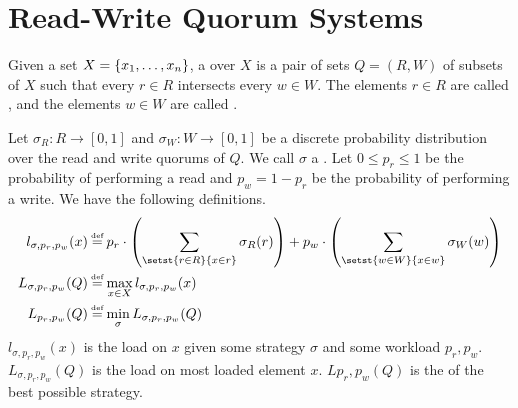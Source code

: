 \section{Read-Write Quorum Systems}

Given a set $X = \{x_1, \ldots, x_n\}$, a 
over $X$ is a pair of sets $Q = (R, W)$ of subsets of $X$ such that every $r
\in R$ intersects every $w \in W$. The elements $r \in R$ are called
, and the elements $w \in W$ are called .



Let $\sigma_R: R \to [0, 1]$ and $\sigma_W: W \to [0, 1]$ be a discrete
probability distribution over the read and write quorums of $Q$. We call
$\sigma$ a . Let $0 \leq p_r \leq 1$ be the probability of
performing a read and $p_w = 1 - p_r$ be the probability of performing a write.
We have the following definitions.
\begin{align*}
  l_{\sigma,p_r,p_w}(x)
    &\defeq p_r \cdot \parens*{\sum_{\setst{r \in R}{x \in r}} \sigma_R(r)} +
            p_w \cdot \parens*{\sum_{\setst{w \in W}{x \in w}} \sigma_W(w)} \\
  L_{\sigma,p_r,p_w}(Q) &\defeq \max_{x \in X} l_{\sigma,p_r,p_w}(x) \\
  L_{p_r,p_w}(Q)        &\defeq \min_\sigma L_{\sigma,p_r,p_w}(Q)
\end{align*}
$l_{\sigma,p_r,p_w}(x)$ is the load on $x$ given some strategy $\sigma$ and
some workload $p_r,p_w$. $L_{\sigma,p_r,p_w}(Q)$ is the load on most loaded
element $x$. $L{p_r,p_w}(Q)$ is the  of the best possible
strategy.

